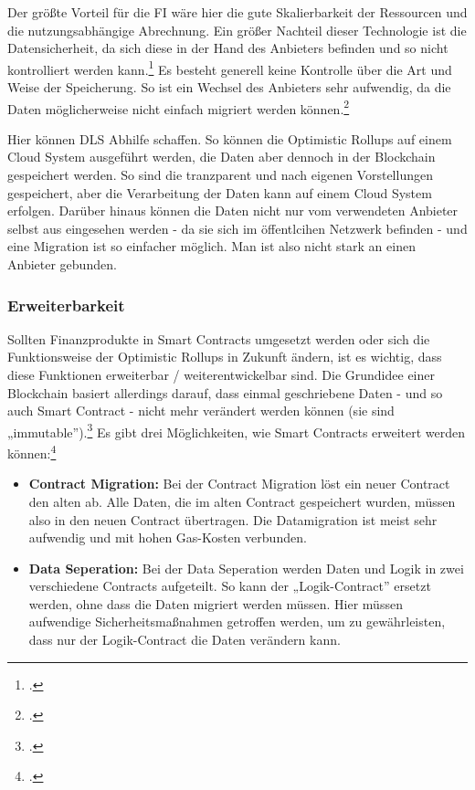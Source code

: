 \documentclass[12pt, a4paper]{article}
\begin{document}
{\noindent
Der größte Vorteil für die FI wäre hier die gute Skalierbarkeit der Ressourcen und die nutzungsabhängige Abrechnung.
\bigbreak
\noindent
Ein größer Nachteil dieser Technologie ist die Datensicherheit, da sich diese in der Hand des Anbieters befinden und so nicht kontrolliert werden kann.\footcite[Vgl. hierzu und zum Folgenden][99]{q10}
Es besteht generell keine Kontrolle über die Art und Weise der Speicherung.
So ist ein Wechsel des Anbieters sehr aufwendig, da die Daten möglicherweise nicht einfach migriert werden können.\footcite[Vgl.][]{w28}

\noindent
Hier können DLS Abhilfe schaffen.
So können die Optimistic Rollups auf einem Cloud System ausgeführt werden, die Daten aber dennoch in der Blockchain gespeichert werden.
So sind die tranzparent und nach eigenen Vorstellungen gespeichert, aber die Verarbeitung der Daten kann auf einem Cloud System erfolgen.
Darüber hinaus können die Daten nicht nur vom verwendeten Anbieter selbst aus eingesehen werden - da sie sich im öffentlcihen Netzwerk befinden - und eine Migration ist so einfacher möglich.
Man ist also nicht stark an einen Anbieter gebunden.

\subsubsection{Erweiterbarkeit}
\label{sec:Erweiterbarkeit}

Sollten Finanzprodukte in Smart Contracts umgesetzt werden oder sich die Funktionsweise der Optimistic Rollups in Zukunft ändern, ist es wichtig, dass diese Funktionen erweiterbar / weiterentwickelbar sind.
Die Grundidee einer Blockchain basiert allerdings darauf, dass einmal geschriebene Daten - und so auch Smart Contract - nicht mehr verändert werden können (sie sind „immutable”).\footcite[Vgl.][]{w30}
Es gibt drei Möglichkeiten, wie Smart Contracts erweitert werden können:\footcite[Vgl. hierzu und zum Folgenden sowie weiterführend][]{w29}
\begin{itemize}
    \item \textbf{Contract Migration:}
    Bei der Contract Migration löst ein neuer Contract den alten ab.
    Alle Daten, die im alten Contract gespeichert wurden, müssen also in den neuen Contract übertragen.
    Die Datamigration ist meist sehr aufwendig und mit hohen Gas-Kosten verbunden.

    \item \textbf{Data Seperation:}
    Bei der Data Seperation werden Daten und Logik in zwei verschiedene Contracts aufgeteilt.
    So kann der „Logik-Contract” ersetzt werden, ohne dass die Daten migriert werden müssen.
    Hier müssen aufwendige Sicherheitsmaßnahmen getroffen werden, um zu gewährleisten, dass nur der Logik-Contract die Daten verändern kann.


\end{itemize}}
\end{document}
